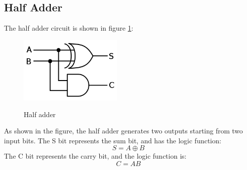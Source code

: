 \subsection{Half Adder}
The half adder circuit is shown in figure \ref{half_adder}:
\begin{figure}[h]
	\caption{Half adder}
	\includegraphics[width=5cm]{img/half_adder.png}
	\centering
	\label{half_adder}
\end{figure}
As shown in the figure, the half adder generates two outputs starting from two input bits. The S bit represents the sum bit, and has the logic function:
\begin{equation}
S = A \oplus B
\end{equation}
The C bit represents the carry bit, and the logic function is:
\begin{equation}
C = AB
\end{equation}
